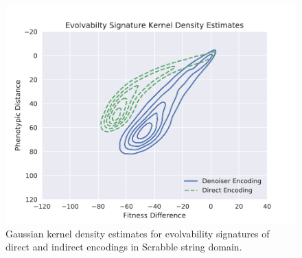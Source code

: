 \begin{figure}
  \includegraphics[width=0.8\linewidth]{img/results/scrabble_es_kde}
  \caption{
    Gaussian kernel density estimates for evolvability signatures of direct and indirect encodings in Scrabble string domain.
  }\label{fig:scrabble_es_kde}
\end{figure}
